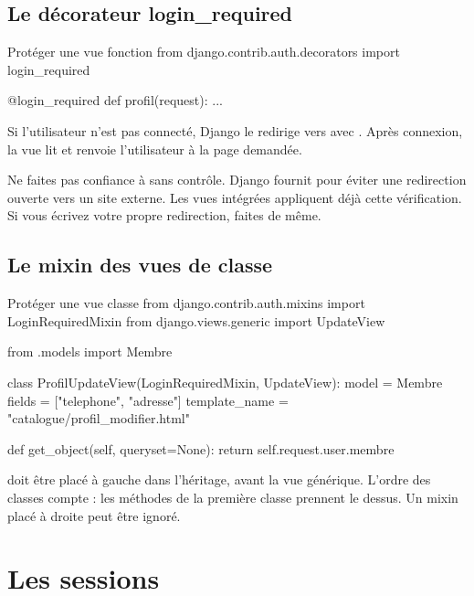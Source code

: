 \subsection{Le décorateur login\_required}

\begin{codebox}[python]{Protéger une vue fonction}
from django.contrib.auth.decorators import login_required


@login_required
def profil(request):
    ...
\end{codebox}

Si l'utilisateur n'est pas connecté, Django le redirige vers
 avec . Après connexion, la vue
 lit  et renvoie l'utilisateur à la page demandée.

\begin{attention}
Ne faites pas confiance à  sans contrôle. Django fournit
 pour éviter une
redirection ouverte vers un site externe. Les vues intégrées appliquent déjà cette
vérification. Si vous écrivez votre propre redirection, faites de même.
\end{attention}

\subsection{Le mixin des vues de classe}

\begin{codebox}[python]{Protéger une vue classe}
from django.contrib.auth.mixins import LoginRequiredMixin
from django.views.generic import UpdateView

from .models import Membre


class ProfilUpdateView(LoginRequiredMixin, UpdateView):
    model = Membre
    fields = ["telephone", "adresse"]
    template_name = "catalogue/profil_modifier.html"

    def get_object(self, queryset=None):
        return self.request.user.membre
\end{codebox}

\begin{attention}
 doit être placé à gauche dans l'héritage, avant la vue
générique. L'ordre des classes compte : les méthodes de la première classe
prennent le dessus. Un mixin placé à droite peut être ignoré.
\end{attention}

\section{Les sessions}

